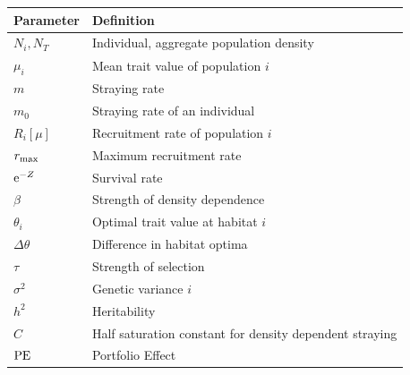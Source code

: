 \documentclass{revtex4}
\begin{document}
\begin{center}
\begin{tabular}{ l|l }
\hline
Parameter & Definition \\
\hline
$N_i,N_T$ & Individual, aggregate population density\\
$\mu_i$ & Mean trait value of population $i$\\
$m$ & Straying rate\\
$m_0$ & Straying rate of an individual\\
$R_i[\mu]$ & Recruitment rate of population $i$\\
$r_{\rm max}$ & Maximum recruitment rate\\
${\rm e}^{-Z}$ & Survival rate\\
$\beta$ & Strength of density dependence\\
$\theta_i$ & Optimal trait value at habitat $i$\\
$\Delta\theta$ & Difference in habitat optima\\
$\tau$ & Strength of selection\\
$\sigma^2$ & Genetic variance $i$\\
$h^2$ & Heritability\\
$C$ & Half saturation constant for density dependent straying\\
${\rm PE}$ & Portfolio Effect\\
\hline
\end{tabular}
\end{center}


\clearpage
\end{document}
